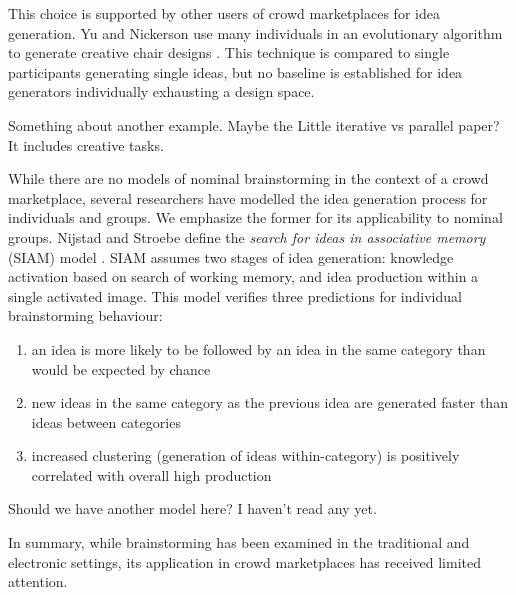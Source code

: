 This choice is supported by other users of crowd marketplaces for idea generation. Yu and Nickerson use many individuals in an evolutionary algorithm to generate creative chair designs \cite{yu_cooks_2011}. This technique is compared to single participants generating single ideas, but no baseline is established for idea generators individually exhausting a design space.

Something about another example. Maybe the Little iterative vs parallel paper? It includes creative tasks.


While there are no models of nominal brainstorming in the context of a crowd marketplace, several researchers have modelled the idea generation process for individuals and groups. We emphasize the former for its applicability to nominal groups. Nijstad and Stroebe define the \emph{search for ideas in associative memory} (SIAM) model \cite{nijstad_how_2006}. SIAM assumes two stages of idea generation: knowledge activation based on search of working memory, and idea production within a single activated image. This model verifies three predictions for individual brainstorming behaviour:

\begin{enumerate}
\item an idea is more likely to be followed by an idea in the same category than would be expected by chance
\item new ideas in the same category as the previous idea are generated faster than ideas between categories
\item increased clustering (generation of ideas within-category) is positively correlated with overall high production
\end{enumerate}

Should we have another model here? I haven't read any yet.

In summary, while brainstorming has been examined in the traditional and electronic settings, its application in crowd marketplaces has received limited attention. 